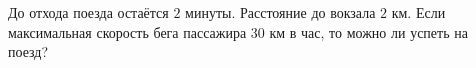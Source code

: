 \begin{ex}
	\begin{condition}
		До отхода поезда остаётся \( 2 \) минуты. Расстояние до вокзала \( 2 \) км. Если максимальная скорость бега пассажира \( 30 \) км в час, то можно ли успеть на поезд?
	\end{condition}
\end{ex}